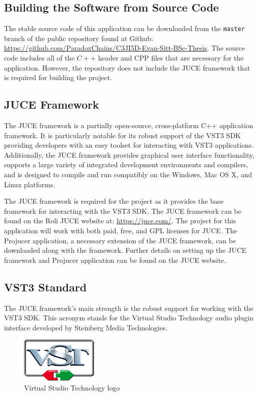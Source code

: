 \documentclass[a4paper,12pt]{report}
\begin{document}
\subsection{Building the Software from Source Code}
\label{subsec:buildingasoftware}
The stable source code of this application can be downloaded from the \texttt{master} branch of the public repository found at Github: \href{https://github.com/ParadoxChains/C3JI5D-Evan-Sitt-BSc-Thesis}{https://github.com/ParadoxChains/C3JI5D-Evan-Sitt-BSc-Thesis}. The source code includes all of the $C++$ header and CPP files that are necessary for the application. However, the repository does not include the JUCE framework that is required for building the project.

\subsection{JUCE Framework}
\label{subsec:juceframework}
The JUCE framework is a partially open-source, cross-platform C++ application framework. It is particularly notable for its robust support of the VST3 SDK providing developers with an easy toolset for interacting with VST3 applications. Additionally, the JUCE framework provides graphical user interface functionality, supports a large variety of integrated development environments and compilers, and is designed to compile and run compatibly on the Windows, Mac OS X, and Linux platforms.

The JUCE framework is required for the project as it provides the base framework for interacting with the VST3 SDK. The JUCE framework can be found on the Roli JUCE website at: \href{https://juce.com/}{https://juce.com/}. The project for this application will work with both paid, free, and GPL licenses for JUCE. The Projucer application, a necessary extension of the JUCE framework, can be downloaded along with the framework. Further details on setting up the JUCE framework and Projucer application can be found on the JUCE website.

\subsection{VST3 Standard}
\label{subsec:vst3standard}
The JUCE framework's main strength is the robust support for working with the VST3 SDK. This acronym stands for the Virtual Studio Technology audio plugin interface developed by Steinberg Media Technologies. 

\begin{figure} \centering
\includegraphics[width=10em]{VST3Logo.png}
    \caption{Virtual Studio Technology logo}     \label{fig:VST3Logo} \end{figure}
\end{document}
